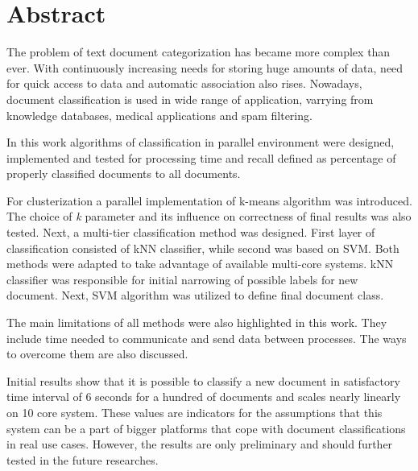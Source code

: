 \chapter*{Abstract}

The problem of text document categorization has became more complex than ever. With continuously increasing needs for storing huge amounts of data, need for quick access to data and automatic association also rises. Nowadays, document classification is used in wide range of application, varrying from knowledge databases, medical applications and spam filtering.

In this work algorithms of classification in parallel environment were designed, implemented and tested for processing time and recall defined as percentage of properly classified documents to all documents. 

For clusterization a parallel implementation of k-means algorithm was introduced. The choice of \textit{k} parameter and its influence on correctness of final results was also tested. Next, a multi-tier classification method was designed. First layer of classification consisted of kNN classifier, while second was based on SVM. Both methods were adapted to take advantage of available multi-core systems. kNN classifier was responsible for initial narrowing of possible labels for new document. Next, SVM algorithm was utilized to define final document class.

The main limitations of all methods were also highlighted in this work. They include time needed to communicate and send data between processes. The ways to overcome them are also discussed.

Initial results show that it is possible to classify a new document in satisfactory time interval of 6 seconds for a hundred of documents and scales nearly linearly on 10 core system. These values are indicators for the assumptions that this system can be a part of bigger platforms that cope with document classifications in real use cases. However, the results are only preliminary and should further tested in the future researches.